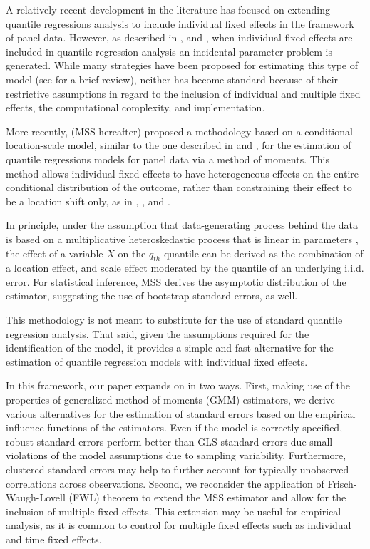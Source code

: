 \documentclass[
  authoryear,
  review,
  1p]{elsarticle}
\begin{document}
A relatively recent development in the literature has focused on
extending quantile regressions analysis to include individual fixed
effects in the framework of panel data. However, as described in
\citet{neymanscott1948}, and \citet{lancaster2000}, when individual
fixed effects are included in quantile regression analysis an incidental
parameter problem is generated. While many strategies have been proposed
for estimating this type of model (see \citet{galvao2017quantile} for a
brief review), neither has become standard because of their restrictive
assumptions in regard to the inclusion of individual and multiple fixed
effects, the computational complexity, and implementation.

More recently, \citet{mss2019} (MSS hereafter) proposed a methodology
based on a conditional location-scale model, similar to the one
described in \citet{he1997} and \citet{zhao2000}, for the estimation of
quantile regressions models for panel data via a method of moments. This
method allows individual fixed effects to have heterogeneous effects on
the entire conditional distribution of the outcome, rather than
constraining their effect to be a location shift only, as in
\citet{canay2011}, \citet{koenker2004}, and \citet{lamarche2010}.

In principle, under the assumption that data-generating process behind
the data is based on a multiplicative heteroskedastic process that is
linear in parameters \citep[\citet{he1997}, \citet{zhao2000},
\citet{cameron2005}]{mss2019}, the effect of a variable \(X\) on the
\(q_{th}\) quantile can be derived as the combination of a location
effect, and scale effect moderated by the quantile of an underlying
i.i.d. error. For statistical inference, MSS derives the asymptotic
distribution of the estimator, suggesting the use of bootstrap standard
errors, as well.

This methodology is not meant to substitute for the use of standard
quantile regression analysis. That said, given the assumptions required
for the identification of the model, it provides a simple and fast
alternative for the estimation of quantile regression models with
individual fixed effects.

In this framework, our paper expands on \citet{mss2019} in two ways.
First, making use of the properties of generalized method of moments
(GMM) estimators, we derive various alternatives for the estimation of
standard errors based on the empirical influence functions of the
estimators. Even if the model is correctly specified, robust standard
errors perform better than GLS standard errors due small violations of
the model assumptions due to sampling variability. Furthermore,
clustered standard errors may help to further account for typically
unobserved correlations across observations. Second, we reconsider the
application of Frisch-Waugh-Lovell (FWL) theorem \citep[ and
\citet{lovell1963}]{frishwaugh1933} to extend the MSS estimator and
allow for the inclusion of multiple fixed effects. This extension may be
useful for empirical analysis, as it is common to control for multiple
fixed effects such as individual and time fixed effects.
\end{document}
